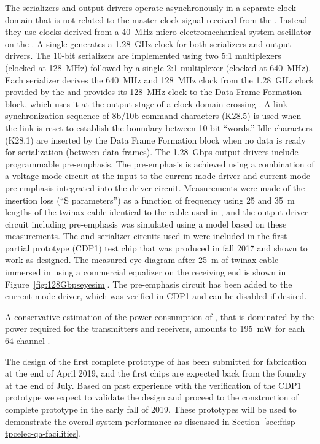 The serializers and output drivers operate asynchronously in a separate clock domain that
is not related to the master clock signal received from the . Instead
they use clocks derived from a \SI{40}{MHz} micro-electromechanical
system oscillator on the . A single  generates a 
\SI{1.28}{GHz} clock for both serializers and output drivers. The \num{10}-bit
serializers are implemented using two \num{5}:\num{1} multiplexers (clocked at \SI{128}{MHz}) 
followed by a single \num{2}:\num{1} multiplexer (clocked at \SI{640}{MHz}). Each serializer 
derives the \SI{640}{MHz} and \SI{128}{MHz} clock from the \SI{1.28}{GHz} 
clock provided by the  and provides its \SI{128}{MHz} clock to 
the Data Frame Formation block, which uses it at the output stage of a 
clock-domain-crossing . A link synchronization sequence of 8b/10b 
command characters (K28.5) is used when the link is reset to establish the 
boundary between \num{10}-bit ``words.'' Idle characters (K28.1) are inserted 
by the Data Frame Formation block when no data is ready for serialization 
(between data frames). The \SI{1.28}{Gbps} output drivers include programmable 
pre-emphasis. The pre-emphasis is achieved using a combination of a voltage 
mode circuit at the input to the current mode driver and current mode 
pre-emphasis integrated into the driver circuit. Measurements were made 
of the insertion loss (``S parameters'') as a function of frequency using
\num{25} and \SI{35}{m} lengths of the twinax cable identical to the 
cable used in , and the output driver circuit including 
pre-emphasis was simulated using a  model based on these 
measurements. The  and serializer circuits used in 
were included in the first partial prototype (CDP1) test chip that was 
produced in fall 2017 and shown to work as designed. The measured eye 
diagram after \SI{25}{m} of twinax cable immersed in  using 
a commercial equalizer on the receiving end is shown in Figure~\ref{fig:128Gbpseyesim}.
The pre-emphasis circuit has been added to the current mode driver, which 
was verified in CDP1 and can be disabled if desired. 

A conservative estimation of the power consumption of ,
that is dominated by the power required for the  transmitters
and receivers, amounts to \SI{195}{mW} for each \num{64}-channel .

The design of the first complete prototype of  has been
submitted for fabrication at the end of April 2019, and the first chips
are expected back from the foundry at the end of July. Based on past 
experience with the verification of the CDP1 prototype we expect to 
validate the design and proceed to the construction of complete 
prototype  in the early fall of 2019. These prototypes will
be used to demonstrate the overall system performance as discussed
in Section~\ref{sec:fdsp-tpcelec-qa-facilities}.

